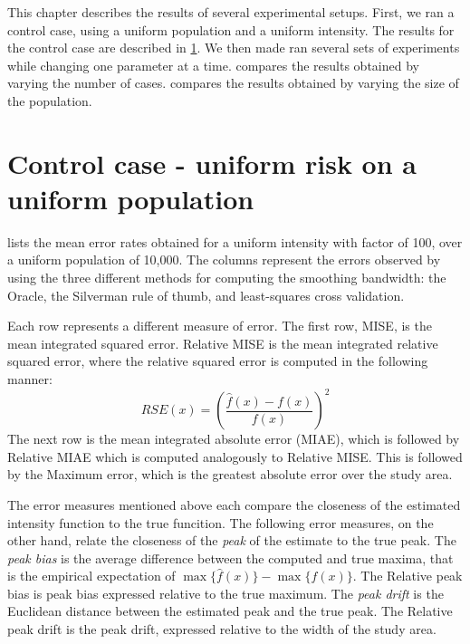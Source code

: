 

This chapter describes the results of several experimental setups.
First, we ran a control case, using a uniform population and a uniform intensity.
The results for the control case are described in \cref{sec:results:unif_100_unif}.
We then made ran several sets of experiments while changing one parameter at a time.
 compares the results obtained by varying the number of cases.
 compares the results obtained by varying the size of the population.


\section{Control case - uniform risk on a uniform population}
\label{sec:results:unif_100_unif}

 lists the mean error rates obtained for a uniform intensity with factor of 100, over a uniform population of 10,000.
The columns represent the errors observed by using the three different methods for computing the smoothing bandwidth:
the Oracle, the Silverman rule of thumb, and least-squares cross validation.

Each row represents a different measure of error.
The first row, MISE, is the mean integrated squared error.
Relative MISE is the mean integrated relative squared error, where the relative squared error is computed in the following manner:
\[ RSE(x) = \left(\frac{\hat{f}(x)-f(x)}{f(x)}\right)^2 \]
The next row is the mean integrated absolute error (MIAE), which is followed by Relative MIAE which is computed analogously to Relative MISE.
This is followed by the Maximum error, which is the greatest absolute error over the study area.

The error measures mentioned above each compare the closeness of the estimated intensity function to the true funcition.
The following error measures, on the other hand, relate the closeness of the \textit{peak} of the estimate to the true peak.
The \textit{peak bias} is the average difference between the computed and true maxima, that is the empirical expectation of \(\max{\{\hat{f}(x)\}} - \max{\{f(x)\}}\).
The Relative peak bias is peak bias expressed relative to the true maximum.
The \textit{peak drift} is the Euclidean distance between the estimated peak and the true peak.
The Relative peak drift is the peak drift, expressed relative to the width of the study area.

